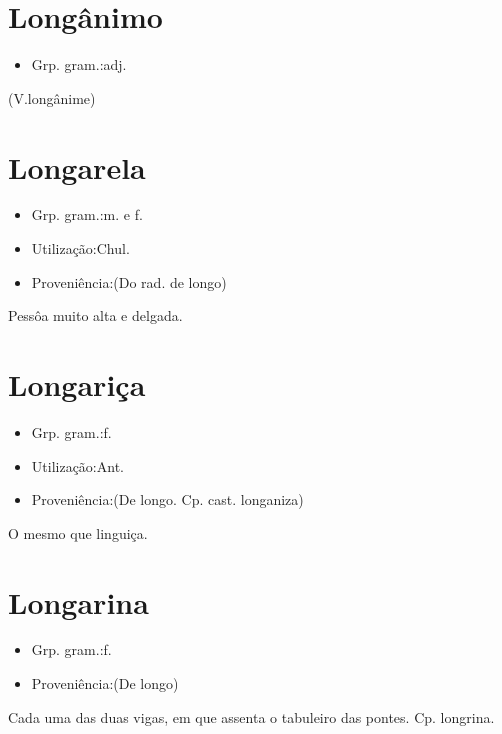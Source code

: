 \section{Longânimo}
\begin{itemize}
\item {Grp. gram.:adj.}
\end{itemize}
(V.longânime)
\section{Longarela}
\begin{itemize}
\item {Grp. gram.:m.  e  f.}
\end{itemize}
\begin{itemize}
\item {Utilização:Chul.}
\end{itemize}
\begin{itemize}
\item {Proveniência:(Do rad. de \textunderscore longo\textunderscore )}
\end{itemize}
Pessôa muito alta e delgada.
\section{Longariça}
\begin{itemize}
\item {Grp. gram.:f.}
\end{itemize}
\begin{itemize}
\item {Utilização:Ant.}
\end{itemize}
\begin{itemize}
\item {Proveniência:(De \textunderscore longo\textunderscore . Cp. cast. \textunderscore longaniza\textunderscore )}
\end{itemize}
O mesmo que \textunderscore linguiça\textunderscore .
\section{Longarina}
\begin{itemize}
\item {Grp. gram.:f.}
\end{itemize}
\begin{itemize}
\item {Proveniência:(De \textunderscore longo\textunderscore )}
\end{itemize}
Cada uma das duas vigas, em que assenta o tabuleiro das pontes.
Cp. \textunderscore longrina\textunderscore .

